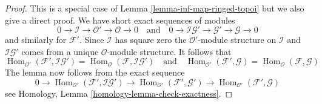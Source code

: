 \documentclass[10pt,a4paper]{amsart}
\theoremstyle{plain}
\theoremstyle{definition}
\theoremstyle{remark}
\numberwithin{equation}{subsection}
\def\Hom{\mathop{\mathrm{Hom}}\nolimits}
\begin{document}
\begin{proof}
This is a special case of Lemma \ref{lemma-inf-map-ringed-topoi} but we also
give a direct proof. We have short exact sequences of modules
$$
0 \to \mathcal{I} \to \mathcal{O}' \to \mathcal{O} \to 0
\quad\text{and}\quad
0 \to \mathcal{I}\mathcal{G}' \to \mathcal{G}' \to \mathcal{G} \to 0
$$
and similarly for $\mathcal{F}'$.
Since $\mathcal{I}$ has square zero the $\mathcal{O}'$-module
structure on $\mathcal{I}$ and $\mathcal{I}\mathcal{G}'$ comes from
a unique $\mathcal{O}$-module structure. It follows that
$$
\Hom_{\mathcal{O}'}(\mathcal{F}', \mathcal{I}\mathcal{G}') =
\Hom_\mathcal{O}(\mathcal{F}, \mathcal{I}\mathcal{G}')
\quad\text{and}\quad
\Hom_{\mathcal{O}'}(\mathcal{F}', \mathcal{G}) =
\Hom_\mathcal{O}(\mathcal{F}, \mathcal{G})
$$
The lemma now follows from the exact sequence
$$
0 \to \Hom_{\mathcal{O}'}(\mathcal{F}', \mathcal{I}\mathcal{G}') \to
\Hom_{\mathcal{O}'}(\mathcal{F}', \mathcal{G}') \to
\Hom_{\mathcal{O}'}(\mathcal{F}', \mathcal{G})
$$
see Homology, Lemma \ref{homology-lemma-check-exactness}.
\end{proof}
\end{document}
